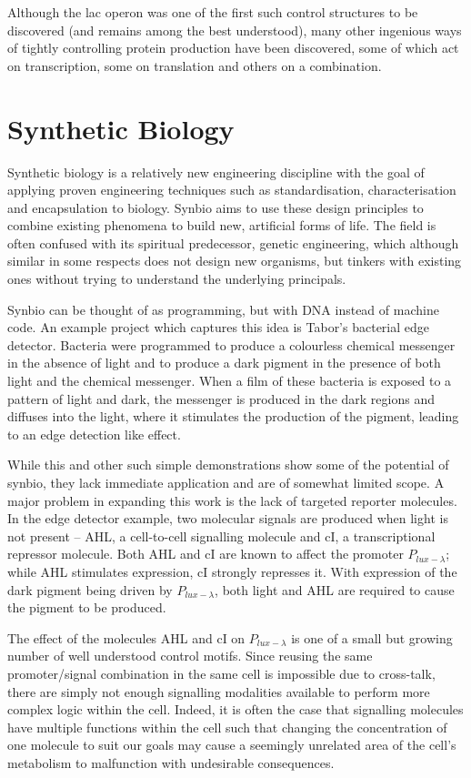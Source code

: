 Although the lac operon was one of the first such control structures to be
discovered (and remains among the best understood), many other ingenious ways
of tightly controlling protein production have been discovered, some of which
act on transcription, some on translation and others on a combination.

\section{Synthetic Biology}
\label{sec:synbio}

Synthetic biology is a relatively new
engineering discipline with the goal of applying proven engineering techniques
such as standardisation, characterisation and encapsulation to biology.
Synbio aims to use these design principles to combine existing phenomena to 
build new, artificial forms of life.
The field is often confused with its spiritual predecessor, genetic 
engineering, which although similar in some respects does not design new
organisms, but tinkers with existing ones without trying to understand the
underlying principals.

Synbio can be thought of as programming, but with DNA instead of machine
code.
An example project which captures this idea is Tabor's bacterial edge
detector\cite{edgeDetector}.
Bacteria were programmed to produce a colourless chemical messenger in the 
absence of light and to produce a dark pigment in the presence of both light 
and the chemical messenger.
When a film of these bacteria is exposed to a pattern of light and dark, the
messenger is produced in the dark regions and diffuses into the light, where it
stimulates the production of the pigment, 
leading to an edge detection like effect.

While this and other such simple demonstrations show some of the potential 
of synbio, they lack immediate application and are of somewhat limited scope.
A major problem in expanding this work is the lack of targeted reporter
molecules.
In the edge detector example, two molecular signals are produced when light is 
not present -- AHL, a cell-to-cell signalling molecule and cI, a
transcriptional repressor molecule.
Both AHL and cI are known to affect the promoter $P_{lux-\lambda}$; while AHL 
stimulates expression, cI strongly represses it.
With expression of the dark pigment being driven by $P_{lux-\lambda}$, 
both light and AHL are required to cause the pigment to be produced.

The effect of the molecules AHL and cI on $P_{lux-\lambda}$ is one of a small
but growing number of well understood control motifs.
Since reusing the same promoter/signal combination in the same cell is 
impossible due to cross-talk, there are simply not enough signalling modalities 
available to perform more complex logic within the cell.
Indeed, it is often the case that signalling molecules have multiple functions
within the cell such that changing the concentration of one molecule to suit
our goals may cause a seemingly unrelated area of the cell's metabolism to
malfunction with undesirable consequences.

